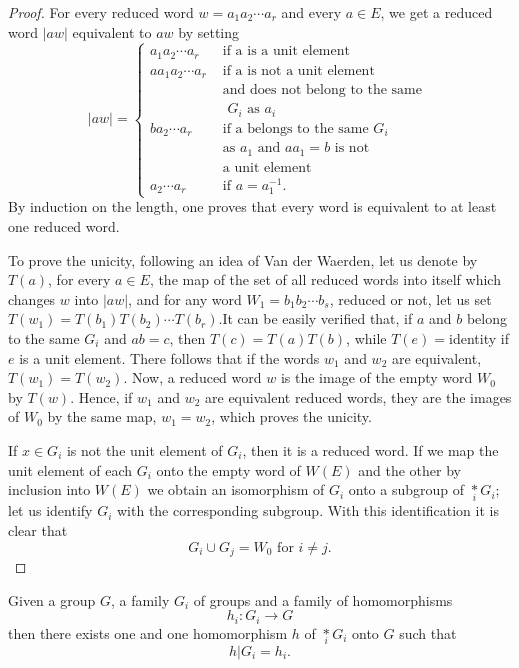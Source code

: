 \begin{proof}
For every reduced word $w=a_1 a_2 \cdots a_r$ and every $a \in E$, we
get a reduced word $|aw|$ equivalent to $a w$ by setting  
$$
|aw|=
\begin{cases}
a_1 a_2 \cdots a_r & \text{ if a is a unit element}\\
aa_1a_2 \cdots a_r & \text{ if a is not a unit element}\\
& \text{ and does not belong to the same }\\
& \text{ $G_i$ as $a_i$}\\ 
ba_2 \cdots a_r & \text{ if a belongs to the same $G_i$ }\\
& \text{ as $a_1$ and $aa_1=b$ is not}\\
& \text{ a unit element}\\ 
a_2 \cdots a_r  & \text{ if } a=a^{-1}_1.
\end{cases}
$$
By induction on the length, one proves that every word is equivalent 
to at least one reduced word. 

To prove the unicity, following an idea of Van der Waerden, let us
denote by $T(a)$,  for every $a \in E$, the map of the set of all
reduced words into itself which changes $w$ into $|aw|$, and for any
word $W_1=b_1 b_2 \cdots b_s$, reduced or not, let us set
$T(w_1)=T(b_1)T(b_2) \cdots T(b_r)$.\pageoriginale It can be easily
verified that, 
if $a$ and $b$ belong to the same $G_i$ and $ab=c$, then
$T(c)=T(a)T(b)$, while $T(e)=$identity if $e$ is a unit
element. There follows that if the words $w_1$ and $w_2$ are
equivalent, $T(w_1)=T(w_2)$. Now, a reduced word $w$ is the image of
the empty word $W_0$ by $T(w)$. Hence, if $w_1$ and $w_2$ are
equivalent reduced words, they are the images of $W_0$ by the same
map, $w_1=w_2$, which proves the unicity. 

If $x \in G_i$ is not the unit element of $G_i$, then it is a reduced 
word. If we map the unit element of each $G_i$ onto the empty word of
$W(E)$ and the other by inclusion into  $W(E)$ we obtain an
isomorphism of $G_i$ onto a subgroup of $\underset{i}{\ast} G_i$; let us
identify $G_i$ with the corresponding subgroup. With this
identification it is clear that 
$$
G_i \cup G_j =W_0 \text{ for } i \neq j.
$$
\end{proof}

\begin{theorem}\label{thm2.2}%
Given a group $G$, a family $G_i$ of groups and a family of
  homomorphisms 
$$
h_i:G_i \to G
$$
then there exists one and one homomorphism $h$ of $\underset{i}* G_i$
onto $G$ such that 
$$
h|G_i =h_i.
$$
\end{theorem}

